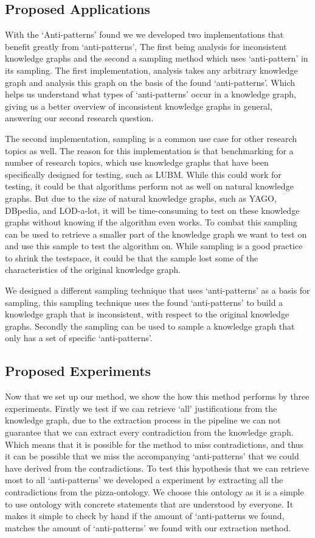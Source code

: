 \documentclass[11pt,letterpaper ,oneside ]{book}
\begin{document}
\subsection{Proposed Applications}
With the `Anti-patterns' found we we developed two implementations that benefit greatly from `anti-patterns', The first being analysis for inconsistent knowledge graphs and the second a sampling method which uses `anti-pattern' in its sampling. The first implementation, analysis takes any arbitrary knowledge graph and analysis this graph on the basis of the found `anti-patterns'. Which helps us understand what types of `anti-patterns' occur in a knowledge graph, giving us a better overview of inconsistent knowledge graphs in general, answering our second research question.

The second implementation, sampling is a common use case for other research topics as well. The reason for this implementation is that benchmarking for a number of research topics, which use knowledge graphs that have been specifically designed for testing, such as LUBM. While this could work for testing, it could be that algorithms perform not as well on natural knowledge graphs. But due to the size of natural knowledge graphs, such as YAGO, DBpedia, and LOD-a-lot, it will be time-consuming to test on these knowledge graphs without knowing if the algorithm even works. To combat this sampling can be used to retrieve a smaller part of the knowledge graph we want to test on and use this sample to test the algorithm on. While sampling is a good practice to shrink the testspace, it could be that the sample lost some of the characteristics of the original knowledge graph. 

We designed a different sampling technique that uses `anti-patterns' as a basis for sampling, this sampling technique uses the found `anti-patterns' to build a knowledge graph that is inconsistent, with respect to the original knowledge graphs. Secondly the sampling can be used to sample a knowledge graph that only has a set of specific `anti-patterns'.

\subsection{Proposed Experiments}
Now that we set up our method, we show the how this method performs by three experiments. 
Firstly we test if we can retrieve `all' justifications from the knowledge graph, due to the extraction process in the pipeline we can not guarantee that we can extract every contradiction from the knowledge graph. Which means that it is possible for the method to miss contradictions, and thus it can be possible that we miss the accompanying `anti-patterns' that we could have derived from the contradictions. To test this hypothesis that we can retrieve most to all `anti-patterns' we developed a experiment by extracting all the contradictions from the pizza-ontology. We choose this ontology as it is a simple to use ontology with concrete statements that are understood by everyone. It makes it simple to check by hand if the amount of `anti-patterns we found, matches the amount of `anti-patterns' we found with our extraction method.
\end{document}
